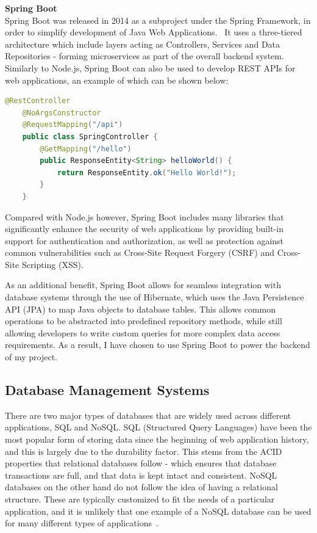 \documentclass[]{final_report}
\begin{document}
\textbf{Spring Boot}\\
Spring Boot was released in 2014 as a subproject under the Spring Framework, in order to simplify development of Java Web Applications.~\cite{MUSIB_SPRING} It uses a three-tiered architecture which include layers acting as Controllers, Services and Data Repositories - forming microservices as part of the overall backend system. Similarly to Node.js, Spring Boot can also be used to develop REST APIs for web applications, an example of which can be shown below:

\begin{lstlisting}[language=java, caption={A basic GET endpoint that responds with "Hello World!"}]
	@RestController
	@NoArgsConstructor
	@RequestMapping("/api")
	public class SpringController {
		@GetMapping("/hello")
		public ResponseEntity<String> helloWorld() {
			return ResponseEntity.ok("Hello World!");
		}
	}
\end{lstlisting}

Compared with Node.js however, Spring Boot includes many libraries that significantly enhance the security of web applications by providing built-in support for authentication and authorization, as well as protection against common vulnerabilities such as Cross-Site Request Forgery (CSRF) and Cross-Site Scripting (XSS). 

As an additional benefit, Spring Boot allows for seamless integration with database systems through the use of Hibernate, which uses the Java Persistence API (JPA) to map Java objects to database tables. This allows common operations to be abstracted into predefined repository methods, while still allowing developers to write custom queries for more complex data access requirements. As a result, I have chosen to use Spring Boot to power the backend of my project.

\subsection {Database Management Systems}

There are two major types of databases that are widely used across different applications, SQL and NoSQL. SQL (Structured Query Languages) have been the most popular form of storing data since the beginning of web application history, and this is largely due to the durability factor. This stems from the ACID properties that relational databases follow - which ensures that database transactions are full, and that data is kept intact and consistent. NoSQL databases on the other hand do not follow the idea of having a relational structure. These are typically customized to fit the needs of a particular application, and it is unlikely that one example of a NoSQL database can be used for many different types of applications~\cite{SQL_COMPARE}.\\
\end{document}
